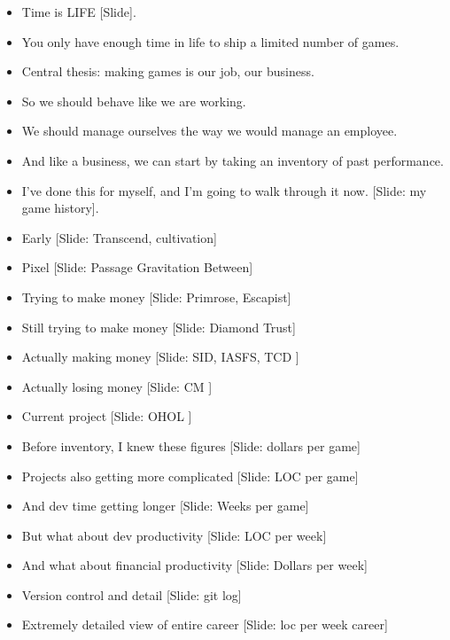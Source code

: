 \documentclass[12pt]{article}
\begin{document}
{\begin{itemize}
\item Time is LIFE [Slide].

\item You only have enough time in life to ship a limited number of games.

\item Central thesis:  making games is our job, our business.

\item So we should behave like we are working.

\item We should manage ourselves the way we would manage an employee.

\item And like a business, we can start by taking an inventory of past performance.

\item I've done this for myself, and I'm going to walk through it now. [Slide:  my game history].

\item Early [Slide:  Transcend, cultivation]
\item Pixel [Slide:  Passage Gravitation Between]
\item Trying to make money [Slide:  Primrose, Escapist]
\item Still trying to make money [Slide:  Diamond Trust]
\item Actually making money [Slide: SID, IASFS, TCD ]
\item Actually losing money [Slide: CM ]
\item Current project [Slide: OHOL ]

\item Before inventory, I knew these figures [Slide: dollars per game]

\item Projects also getting more complicated [Slide: LOC per game]


\item And dev time getting longer [Slide: Weeks per game]

\item But what about dev productivity [Slide: LOC per week]

\item And what about financial productivity [Slide: Dollars per week]

\item Version control and detail [Slide: git log]

\item Extremely detailed view of entire career  [Slide: loc per week career]


\end{itemize}}
\end{document}
